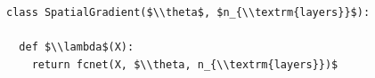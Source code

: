 \documentclass[border=10pt]{standalone}
\begin{document}
\begin{lstlisting}
class SpatialGradient($\\theta$, $n_{\\textrm{layers}}$):

  def $\\lambda$(X):
    return fcnet(X, $\\theta, n_{\\textrm{layers}})$
\end{lstlisting}
\end{document}
